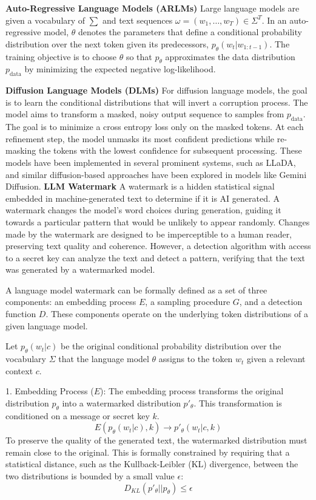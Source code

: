\textbf{Auto-Regressive Language Models (ARLMs)} Large language models \cite{devlin2019bertpretrainingdeepbidirectional} are
    given a vocabulary of $\sum$ and text sequences \(\omega = (w_1,\dots,w_T) \in \Sigma^T\). In an auto-regressive model, $\theta$
    denotes the parameters that define a conditional probability distribution over the next token given its predecessors,
  $p_\theta(w_t
    | w_{1:t-1})$. The training objective is to choose \(\theta\) so that \(p_\theta\) approximates the data distribution
    \(p_{\text{data}}\) by minimizing the expected negative log-likelihood.

  \textbf{Diffusion Language Models (DLMs)} For diffusion language models, the goal is to learn the conditional
  distributions that will invert a corruption process. The model aims to transform a masked, noisy output sequence to samples from \(p_{\text{data}}\). The goal is to minimize a cross entropy loss only on the masked tokens. At each refinement step, the model unmasks its most confident predictions while re-masking the tokens with the lowest confidence for subsequent processing. These models have been implemented in several prominent systems, such as LLaDA, and similar diffusion-based approaches have been explored in models like Gemini Diffusion.
  \newline
  \textbf{LLM Watermark}
  A watermark is a hidden statistical signal embedded in machine-generated text to determine if it is AI generated. A watermark changes the model’s word choices during generation, guiding it towards a particular pattern that would be unlikely to appear randomly. Changes made by the watermark are designed to be imperceptible to a human reader, preserving text quality and coherence. However, a
  detection algorithm with access to a secret key can analyze the text and detect a pattern, verifying that the text was generated by a
  watermarked model.

   A language model watermark can be formally defined as a set of three components: an embedding process \(E\), a sampling procedure
  \(G\), and a
    detection function \(D\). These components operate on the underlying token distributions of a given language model.

    Let \(p_\theta(w_t | c)\) be the original conditional probability distribution over the vocabulary \(\Sigma\) that the language
  model \(\theta\)
    assigns to the token \(w_t\) given a relevant context \(c\).

      1. Embedding Process (\(E\)): The embedding process transforms the original distribution \(p_\theta\) into a watermarked
         distribution \(p'_\theta\).
        This transformation is conditioned on a message or secret key \(k\).
        \[ E(p_\theta(w_t | c), k) \rightarrow p'_\theta(w_t | c, k) \]
        To preserve the quality of the generated text, the watermarked distribution must remain close to the original. This is
  formally constrained by
    requiring that a statistical distance, such as the Kullback-Leibler (KL) divergence, between the two distributions is bounded by a
  small value
    \(\epsilon\):
        \[ D_{KL}(p'_\theta || p_\theta) \leq \epsilon \]


